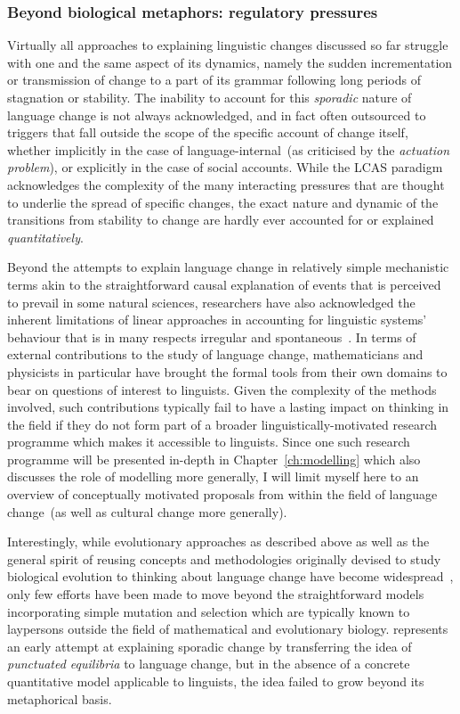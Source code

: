 \subsubsection{Beyond biological metaphors: regulatory pressures}

Virtually all approaches to explaining linguistic changes discussed so far struggle with one and the same aspect of its dynamics, namely the sudden incrementation or transmission of change to a part of its grammar following long periods of stagnation or stability. The inability to account for this \emph{sporadic} nature of language change is not always acknowledged, and in fact often outsourced to triggers that fall outside the scope of the specific account of change itself, whether implicitly in the case of language-internal~(as criticised by the \emph{actuation problem}), or explicitly in the case of social accounts.
While the LCAS paradigm acknowledges the complexity of the many interacting pressures that are thought to underlie the spread of specific changes, the exact nature and dynamic of the transitions from stability to change are hardly ever accounted for or explained \emph{quantitatively}.

Beyond the attempts to explain language change in relatively simple mechanistic terms akin to the straightforward causal explanation of events that is perceived to prevail in some natural sciences, researchers have also acknowledged the inherent limitations of linear approaches in accounting for linguistic systems' behaviour that is in many respects irregular and spontaneous~\citep[see e.g.][]{Fortescue2006}.
In terms of external contributions to the study of language change, mathematicians and physicists in particular have brought the formal tools from their own domains to bear on questions of interest to linguists. Given the complexity of the methods involved, such contributions typically fail to have a lasting impact on thinking in the field if they do not form part of a broader linguistically-motivated research programme which makes it accessible to linguists. Since one such research programme will be presented in-depth in Chapter~\ref{ch:modelling} which also discusses the role of modelling more generally, I will limit myself here to an overview of conceptually motivated proposals from within the field of language change~(as well as cultural change more generally).

Interestingly, while evolutionary approaches as described above as well as the general spirit of reusing concepts and methodologies originally devised to study biological evolution to thinking about language change have become widespread~\citep{Atkinson2005}, only few efforts have been made to move beyond the straightforward models incorporating simple mutation and selection which are typically known to laypersons outside the field of mathematical and evolutionary biology.
\citet{Dixon1997} represents an early attempt at explaining sporadic change by transferring the idea of \emph{punctuated equilibria} to language change, but in the absence of a concrete quantitative model applicable to linguists, the idea failed to grow beyond its metaphorical basis.

